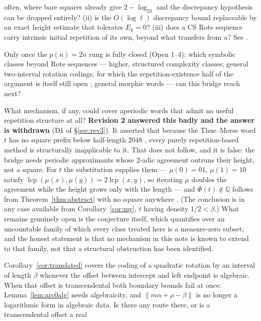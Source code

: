 \documentclass[11pt]{article}
\newcommand{\Q}{\mathbb{Q}}
\newcommand{\repo}[1]{\text{\texttt{#1}}}
\begin{document}
\begin{description}[leftmargin=3em,style=nextline]
often, where bare squares already give $2-\log_23$ and the discrepancy hypothesis can be dropped
entirely? (ii) is the $O(\log\ell)$ discrepancy bound replaceable by an exact height estimate that
tolerates $E_k=0$? (iii) does a CS Rote sequence carry intrinsic initial repetition of its own,
beyond what transfers from $u$? See \repo{theorems/phase8/PHASE8\_NEXT\_TARGET.md}.
\item[Open 5 --- Higher complexity.] Only once the $p(n)=2n$ rung is fully closed (Open 1--4): which symbolic classes beyond Rote sequences --- higher, structured complexity classes; general two-interval rotation codings, for which the repetition-existence half of the argument is itself still open \cite{Phase2Rotation}; general morphic words --- can this bridge reach next?
\item[Open 6 --- The full Periodicity Conjecture.] What mechanism, if any, could cover aperiodic
words that admit no useful repetition structure at all? \textbf{Revision 2 answered this badly and
the answer is withdrawn} (D1 of \S\ref{sec:rev3}). It asserted that because the Thue--Morse word $t$
has no square prefix below half-length $2048$ \cite{Phase1Gap}, every purely repetition-based method
is structurally inapplicable to it. That does not follow, and it is false: the bridge needs periodic
approximants whose 2-adic agreement outruns their height, not a square. For $t$ the substitution
supplies them --- $\mu(0)=01$, $\mu(1)=10$ satisfy
$\operatorname{lcp}(\mu(x),\mu(y))=2\operatorname{lcp}(x,y)$, so iterating $\mu$ doubles the
agreement while the height grows only with the length --- and $\Phi(t)\notin\Q$ follows from
Theorem~\ref{thm:abstract} with no square anywhere \cite{Phase9bTM}. (The conclusion is in any case
available from Corollary~\ref{cor:my}, $t$ having density $1/2<\beta$.) What remains genuinely open
is the conjecture itself, which quantifies over an uncountable family of which every class treated
here is a measure-zero subset; and the honest statement is that no mechanism in this note is known to
extend to that family, not that a structural obstruction has been identified.
\item[Open 7 --- Beyond an algebraic offset.] Corollary~\ref{cor:translated} covers the coding of a
quadratic rotation by an interval of length $\beta$ whenever the offset between intercept and left
endpoint is algebraic. When that offset is transcendental both boundary bounds fail at once:
Lemma~\ref{lem:arc0alg} needs algebraicity, and $\lVert m\alpha+\rho-\beta\rVert$ is no longer a
logarithmic form in algebraic data. Is there any route there, or is a transcendental offset a real

\end{description}
\end{document}
